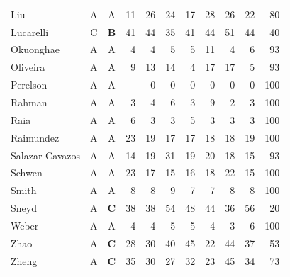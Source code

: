 \begin{longtable}{@{}lccrrrrrrrr@{}}
Liu & A & A & 11 & 26 & 24 & 17 & 28 & 26 & 22 & 80 \\
Lucarelli & C & \textbf{B} & 41 & 44 & 35 & 41 & 44 & 51 & 44 & 40 \\
Okuonghae & A & A & 4 & 4 & 5 & 5 & 11 & 4 & 6 & 93 \\
Oliveira & A & A & 9 & 13 & 14 & 4 & 17 & 17 & 5 & 93 \\
Perelson & A & A & -- & 0 & 0 & 0 & 0 & 0 & 0 & 100 \\
Rahman & A & A & 3 & 4 & 6 & 3 & 9 & 2 & 3 & 100 \\
Raia & A & A & 6 & 3 & 3 & 5 & 3 & 3 & 3 & 100 \\
Raimundez & A & A & 23 & 19 & 17 & 17 & 18 & 18 & 19 & 100 \\
Salazar-Cavazos & A & A & 14 & 19 & 31 & 19 & 20 & 18 & 15 & 93 \\
Schwen & A & A & 23 & 17 & 15 & 16 & 18 & 22 & 15 & 100 \\
Smith & A & A & 8 & 8 & 9 & 7 & 7 & 8 & 8 & 100 \\
Sneyd & A & \textbf{C} & 38 & 38 & 54 & 48 & 44 & 36 & 56 & 20 \\
Weber & A & A & 4 & 4 & 5 & 5 & 4 & 3 & 6 & 100 \\
Zhao & A & \textbf{C} & 28 & 30 & 40 & 45 & 22 & 44 & 37 & 53 \\
Zheng & A & \textbf{C} & 35 & 30 & 27 & 32 & 23 & 45 & 34 & 73 \\
\bottomrule
\end{longtable}
